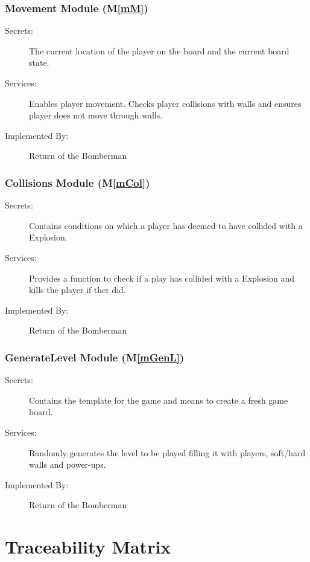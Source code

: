 \documentclass[12pt, titlepage]{article}
\newcommand{\mref}[1]{M\ref{#1}}
\begin{document}
\subsubsection{Movement Module (\mref{mM})}

\begin{description}
\item[Secrets:]The current location of the player on the board and the current board state.
\item[Services:]Enables player movement. Checks player collisions with walls and ensures player does not move through walls.
\item[Implemented By:] Return of the Bomberman
\end{description}

\subsubsection{Collisions Module (\mref{mCol})}

\begin{description}
\item[Secrets:] Contains conditions on which a player has deemed to have collided with a Explosion. 
\item[Services:] Provides a function to check if a play has collided with a Explosion and kills the player if ther did.
\item[Implemented By:] Return of the Bomberman
\end{description}

\subsubsection{GenerateLevel Module (\mref{mGenL})}

\begin{description}
\item[Secrets:] Contains the template for the game and means to create a fresh game board.
\item[Services:] Randomly generates the level to be played filling it with players, soft/hard walls and power-ups.
\item[Implemented By:] Return of the Bomberman
\end{description}



\section{Traceability Matrix} \label{SecTM}
\end{document}
